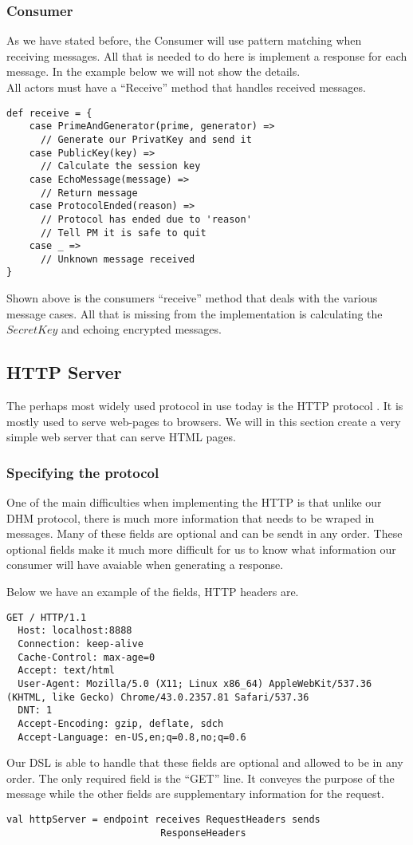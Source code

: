 \subsubsection{Consumer}
As we have stated before, the Consumer will use pattern matching when receiving messages. All that is needed to do here is implement a response for each message. In the example below we will not show the details. 
\\
All actors must have a ``Receive'' method that handles received messages. 
\begin{lstlisting}[style=myScalastyle]
def receive = {
    case PrimeAndGenerator(prime, generator) =>
      // Generate our PrivatKey and send it
    case PublicKey(key) =>
      // Calculate the session key
    case EchoMessage(message) =>
      // Return message
    case ProtocolEnded(reason) =>
      // Protocol has ended due to 'reason'
      // Tell PM it is safe to quit
    case _ =>
      // Unknown message received
}
\end{lstlisting}
Shown above is the consumers ``receive'' method that deals with the various message cases. All that is missing from the implementation is calculating the $SecretKey$ and echoing encrypted messages.

\subsection{HTTP Server}
The perhaps most widely used protocol in use today is the HTTP protocol \cite{fielding1999hypertext}. It is mostly used to serve web-pages to browsers. We will in this section create a very simple web server that can serve HTML pages.

\subsubsection{Specifying the protocol}
One of the main difficulties when implementing the HTTP is that unlike our DHM protocol, there is much more information that needs to be wraped in messages. Many of these fields are optional and can be sendt in any order. These optional fields make it much more difficult for us to know what information our consumer will have avaiable when generating a response.

Below we have an example of the fields, HTTP headers are.
\begin{lstlisting}[style=myScalastyle]
  GET / HTTP/1.1
  Host: localhost:8888
  Connection: keep-alive
  Cache-Control: max-age=0
  Accept: text/html
  User-Agent: Mozilla/5.0 (X11; Linux x86_64) AppleWebKit/537.36 (KHTML, like Gecko) Chrome/43.0.2357.81 Safari/537.36
  DNT: 1
  Accept-Encoding: gzip, deflate, sdch
  Accept-Language: en-US,en;q=0.8,no;q=0.6
\end{lstlisting}
Our DSL is able to handle that these fields are optional and allowed to be in any order. The only required field is the ``GET'' line. It conveyes the purpose of the message while the other fields are supplementary information for the request.
\begin{lstlisting}[style=myScalastyle]
val httpServer = endpoint receives RequestHeaders sends 
                           ResponseHeaders 
\end{lstlisting}

